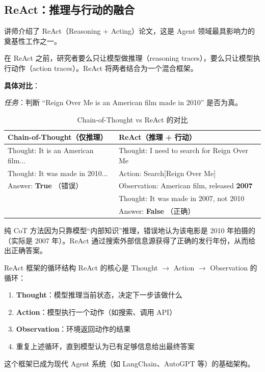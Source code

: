 \documentclass[a4paper]{article}
\begin{document}
\subsection{ReAct：推理与行动的融合}

讲师介绍了 ReAct（Reasoning + Acting）论文，这是 Agent 领域最具影响力的奠基性工作之一。

在 ReAct 之前，研究者要么只让模型做推理（reasoning traces），要么只让模型执行动作（action traces）。ReAct 将两者结合为一个混合框架。

\textbf{具体对比}：

\textit{任务}：判断 ``Reign Over Me is an American film made in 2010'' 是否为真。

\begin{table}[H]
\centering
\begin{tabular}{p{6cm}p{6cm}}
\toprule
\textbf{Chain-of-Thought（仅推理）} & \textbf{ReAct（推理 + 行动）} \\
\midrule
Thought: It is an American film... & Thought: I need to search for Reign Over Me \\
Thought: It was made in 2010... & Action: Search{[}Reign Over Me{]} \\
Answer: \textbf{True} {\color{red}（错误）} & Observation: American film, released \textbf{2007} \\
 & Thought: It was made in 2007, not 2010 \\
 & Answer: \textbf{False} {\color{green!60!black}（正确）} \\
\bottomrule
\end{tabular}
\caption{Chain-of-Thought vs ReAct 的对比}
\end{table}

纯 CoT 方法因为只靠模型``内部知识''推理，错误地认为该电影是 2010 年拍摄的（实际是 2007 年）。ReAct 通过搜索外部信息源获得了正确的发行年份，从而给出正确答案。

\begin{importantbox}{ReAct 框架的循环结构}
ReAct 的核心是 Thought $\rightarrow$ Action $\rightarrow$ Observation 的循环：
\begin{enumerate}
    \item \textbf{Thought}：模型推理当前状态，决定下一步该做什么
    \item \textbf{Action}：模型执行一个动作（如搜索、调用 API）
    \item \textbf{Observation}：环境返回动作的结果
    \item 重复上述循环，直到模型认为已有足够信息给出最终答案
\end{enumerate}
这个框架已成为现代 Agent 系统（如 LangChain、AutoGPT 等）的基础架构。
\end{importantbox}
\end{document}
